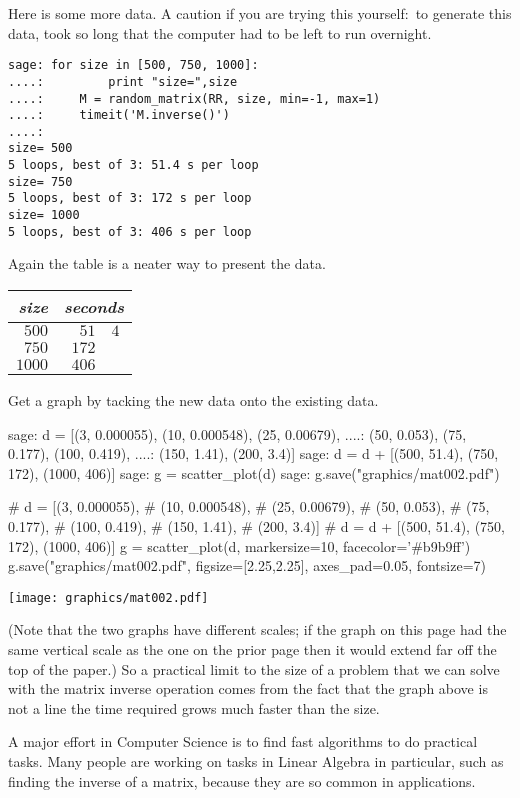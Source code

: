 Here is some more data.
A caution if you are trying this yourself:~to generate this data, 
took so long that
the computer had to be left to run overnight.
\begin{lstlisting}
sage: for size in [500, 750, 1000]:                             
....:         print "size=",size
....:     M = random_matrix(RR, size, min=-1, max=1)
....:     timeit('M.inverse()')
....: 
size= 500
5 loops, best of 3: 51.4 s per loop
size= 750
5 loops, best of 3: 172 s per loop
size= 1000
5 loops, best of 3: 406 s per loop
\end{lstlisting}
Again the table is a neater way to present the data.
\begin{center}
  \begin{tabular}{r|r@{.}l}
    \multicolumn{1}{r}{\textit{size}}     &\multicolumn{2}{c}{\textit{seconds}}  \\  \hline
    $500$       &$51$ &$4$ \\
    $750$       &$172$ &   \\
    $1000$      &$406$ &   
  \end{tabular}
\end{center}
Get a graph by tacking the new data onto the existing data.
\begin{sagecommandline}
sage: d = [(3, 0.000055), (10, 0.000548), (25, 0.00679),  
....:      (50, 0.053), (75, 0.177), (100, 0.419), 
....:      (150, 1.41), (200, 3.4)]
sage: d = d + [(500, 51.4), (750, 172), (1000, 406)]
sage: g = scatter_plot(d)                           
sage: g.save("graphics/mat002.pdf")                      
\end{sagecommandline}
\begin{sagesilent}
# d = [(3, 0.000055),    
#      (10, 0.000548), 
#      (25, 0.00679),  
#      (50, 0.053), 
#      (75, 0.177), 
#      (100, 0.419), 
#      (150, 1.41), 
#      (200, 3.4)]
# d = d + [(500, 51.4), (750, 172), (1000, 406)]
g = scatter_plot(d, markersize=10, facecolor='#b9b9ff')
g.save("graphics/mat002.pdf", figsize=[2.25,2.25], axes_pad=0.05, fontsize=7)              
\end{sagesilent}
\begin{center}
  \texttt{[image: graphics/mat002.pdf]}
\end{center}
(Note that the two graphs have different scales;
if the graph on this page had the same vertical scale as the one on the prior
page then it would extend far off the top of the paper.)
So a practical limit to the size of a problem that we can solve with
the matrix inverse operation comes from the fact that the graph above is
not a line\Dash
the time required grows much faster than the size.

A major effort in Computer Science is to find fast algorithms to 
do practical tasks.
Many people are working on tasks in Linear Algebra in particular,
such as finding the inverse of a matrix, because
they are so common in applications.

\endinput


TODO:
